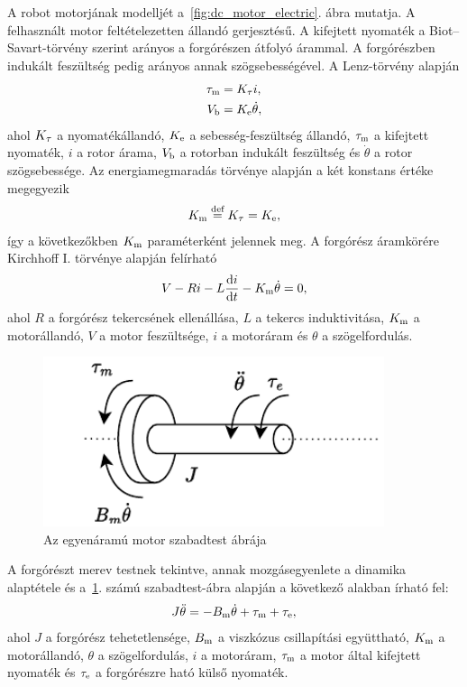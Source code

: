 A robot motorjának modelljét a~\ref{fig:dc_motor_electric}. ábra mutatja. A felhasznált motor feltételezetten állandó gerjesztésű. A kifejtett nyomaték 
a Biot--Savart-törvény szerint arányos a forgórészen átfolyó árammal. A forgórészben
indukált feszültség pedig arányos annak szögsebességével. A Lenz-törvény alapján 
\begin{equation}
\begin{split}
    \tau_{\mathrm{m}} &= K_{\mathrm{\tau}} i, \\
    V_{\mathrm{b}} &= K_{\mathrm{e}} \dot\theta,
\end{split}
\end{equation}
ahol $K_{\mathrm{\tau}}$ a nyomatékállandó, $K_{\mathrm{e}}$ a sebesség-feszültség állandó, $\tau_{\mathrm{m}}$ a kifejtett 
nyomaték, $i$ a rotor árama, $V_{\mathrm{b}}$ a rotorban indukált feszültség és $\dot\theta$ a rotor szögsebessége.
Az energiamegmaradás törvénye alapján a két konstans értéke megegyezik
\begin{align}
    K_{\mathrm{m}} \stackrel{\text{def}}{=} K_{\mathrm{\tau}} = K_{\mathrm{e}},
\end{align}
így a következőkben $K_{\mathrm{m}}$ paraméterként jelennek meg. A forgórész áramkörére Kirchhoff I. törvénye alapján felírható
\begin{align}\label{eq:armature_circuit}
    V - Ri - L\frac{\mathrm{d} i}{\mathrm{d} t} - K_{\mathrm{m}}\dot\theta = 0,
\end{align}
ahol $R$ a forgórész tekercsének ellenállása, $L$ a tekercs induktivitása, 
$K_{\mathrm{m}}$ a motorállandó, $V$ a motor feszültsége, $i$ a motoráram és $\theta$ a szögelfordulás.
\begin{figure}[h]
    \begin{center}
    \includegraphics[width=10cm]{images/motor_model_mechanical.pdf}
    \caption{Az egyenáramú motor szabadtest ábrája}
    \label{fig:dc_motor_mechanical}
    \end{center}
\end{figure}
A forgórészt merev testnek tekintve, annak mozgásegyenlete a dinamika alaptétele és a~\ref{fig:dc_motor_mechanical}. számú 
szabadtest-ábra alapján a következő alakban írható fel:
\begin{align}\label{eq:rotor_dynamics}
    J\ddot\theta = -B_{\mathrm{m}}\dot\theta + \tau_{\mathrm{m}} + \tau_{\mathrm{e}},
\end{align}
ahol $J$ a forgórész tehetetlensége, $B_{\mathrm{m}}$ a viszkózus csillapítási együttható, 
$K_{\mathrm{m}}$ a motorállandó, $\theta$ a szögelfordulás, $i$ a motoráram, $\tau_{\mathrm{m}}$ a motor által kifejtett nyomaték 
és $\tau_{\mathrm{e}}$ a forgórészre ható külső nyomaték. 
    

